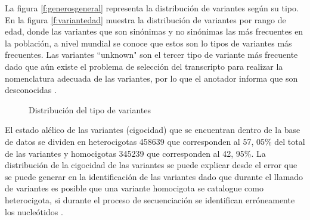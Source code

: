 La figura \ref{f:generosgeneral} representa la distribución de variantes según su tipo. En la figura \ref{f:variantedad} muestra la distribución  de variantes por rango de edad, donde las variantes que son sinónimas y no sinónimas las más frecuentes en la población, a  nivel mundial se conoce que estos son lo tipos de variantes más frecuentes\cite{Fu2013}. Las variantes ``unknown"  son el tercer tipo de variante más frecuente dado que aún existe el problema de selección del transcripto para realizar la nomenclatura adecuada de las variantes, por lo que el anotador informa que son desconocidas \cite{McCarthy2014}. \\

\begin{figure}[H]
	\centering
	\caption{Distribución del tipo de variantes}
	\label{f:variantesgeneral}
\end{figure}


El estado alélico de las variantes (cigocidad) que se encuentran dentro de la base de datos se dividen en heterocigotas 458639 que corresponden al 57, 05\% del total de las variantes  y homocigotas 345239 que corresponden al 42, 95\%. La distribución de la cigocidad de las variantes se puede explicar desde el error que se puede generar en la identificación de las variantes dado que durante el llamado  de variantes es posible que una variante homocigota se catalogue como heterocigota, si durante el proceso de secuenciación se identifican erróneamente los nucleótidos \cite{Babraham2016}\cite{Pirooznia2014}. 

